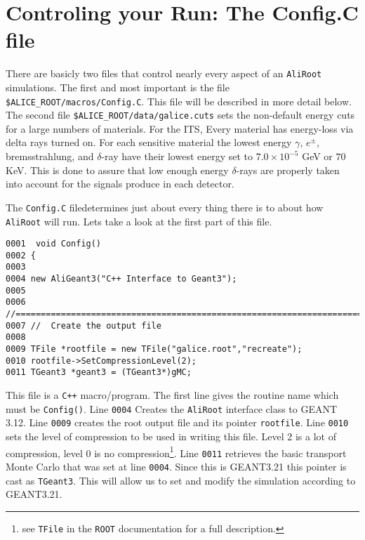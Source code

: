 \section*{Controling your Run: The Config.C file}

There are basicly two files that control nearly every aspect of an
\texttt{AliRoot} simulations. The first and most important is the file
\texttt{\$ALICE\_ROOT/macros/Config.C}. This file will be described in more
detail below. The second file \texttt{\$ALICE\_ROOT/data/galice.cuts} sets the
non-default energy cuts for a large numbers of materials. For the ITS, Every
material has energy-loss via delta rays turned on. For each sensitive material
the lowest energy $\gamma$, $e^{\pm}$, bremsstrahlung, and $\delta$-ray have
their lowest energy set to $7.0\times 10^{-5}$ GeV or $70$ KeV. This is done to
assure that low enough energy $\delta$-rays are properly taken into account for
the signals produce in each detector.

The \texttt{Config.C} file\footnotemark determines just about every thing there
is to about how \texttt{AliRoot} will run. Lets take a look at the first part
of this file.


\scriptsize
\begin{verbatim}
0001  void Config()
0002 {
0003 
0004 new AliGeant3("C++ Interface to Geant3");
0005 
0006 //=======================================================================
0007 //  Create the output file
0008 
0009 TFile *rootfile = new TFile("galice.root","recreate");
0010 rootfile->SetCompressionLevel(2);
0011 TGeant3 *geant3 = (TGeant3*)gMC;
\end{verbatim}
\normalsize

This file is a \texttt{C++} macro/program. The first line gives the routine
name which must be \texttt{Config()}. Line \texttt{0004} Creates the
\texttt{AliRoot} interface class to GEANT 3.12. Line \texttt{0009} creates the
root output file and its pointer \texttt{rootfile}. Line \texttt{0010} sets the
level of compression to be used in writing this file. Level 2 is a lot of
compression, level 0 is no compression\footnote{see \texttt{TFile} in the
\texttt{ROOT} documentation for a full description.}. Line \texttt{0011}
retrieves the basic transport Monte Carlo that was set at line
\texttt{0004}. Since this is GEANT3.21 this pointer is cast as
\texttt{TGeant3}. This will allow us to set and modify the simulation according
to GEANT3.21.


